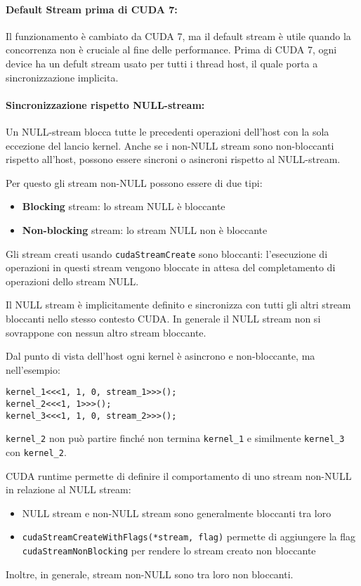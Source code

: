 \paragraph{Default Stream prima di CUDA 7:} Il funzionamento è cambiato da CUDA 7, ma il default stream è utile quando la concorrenza non è cruciale al fine delle performance. Prima di CUDA 7, ogni device ha un defult stream usato per tutti i thread host, il quale porta a sincronizzazione implicita.

\paragraph{Sincronizzazione rispetto NULL-stream:} Un NULL-stream blocca tutte le precedenti operazioni dell'host con la sola eccezione del lancio kernel. Anche se i non-NULL stream sono non-bloccanti rispetto all'host, possono essere sincroni o asincroni rispetto al NULL-stream. 

Per questo gli stream non-NULL possono essere di due tipi: 
\begin{itemize}
	\item \textbf{Blocking} stream: lo stream NULL è bloccante
	
	\item \textbf{Non-blocking} stream: lo stream NULL non è bloccante
\end{itemize}

Gli stream creati usando \texttt{cudaStreamCreate} sono bloccanti: l'esecuzione di operazioni in questi stream vengono bloccate in attesa del completamento di operazioni dello stream NULL.  

Il NULL stream è implicitamente definito e sincronizza con tutti gli altri stream bloccanti nello stesso contesto CUDA. In generale il NULL stream non si sovrappone con nessun altro stream bloccante.

Dal punto di vista dell'host ogni kernel è asincrono e non-bloccante, ma nell'esempio: 
\begin{verbatim}
kernel_1<<<1, 1, 0, stream_1>>>();
kernel_2<<<1, 1>>>();
kernel_3<<<1, 1, 0, stream_2>>>();
\end{verbatim}
\texttt{kernel\_2} non può partire finché non termina \texttt{kernel\_1} e similmente \texttt{kernel\_3} con \texttt{kernel\_2}.

CUDA runtime permette di definire il comportamento di uno stream non-NULL in relazione al NULL stream:
\begin{itemize}
	\item NULL stream e non-NULL stream sono generalmente bloccanti tra loro
	
	\item \texttt{cudaStreamCreateWithFlags(*stream, flag)} permette di aggiungere la flag \texttt{cudaStreamNonBlocking} per rendere lo stream creato non bloccante
\end{itemize}
Inoltre, in generale, stream non-NULL sono tra loro non bloccanti.

